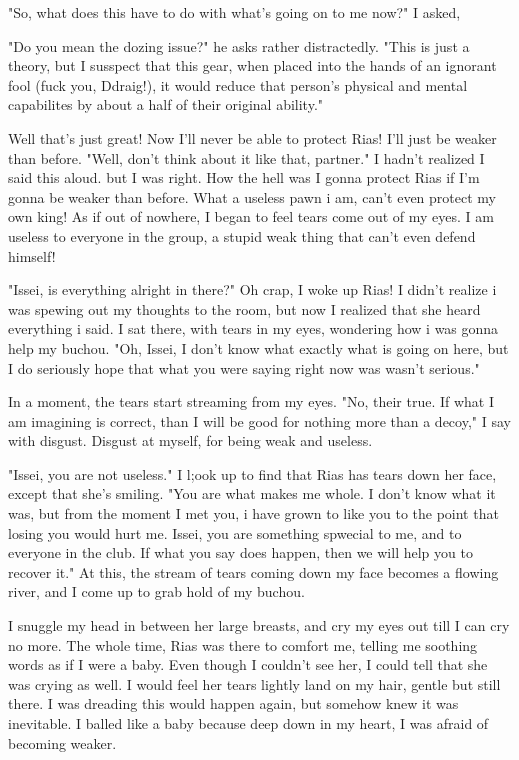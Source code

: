 \documentclass{article}
\begin{document}
"So, what does this have to do with what's going on to me now?" I asked,

"Do you mean the dozing issue?" he asks rather distractedly. "This is just a theory, but I susspect that this gear, when placed into the hands of an ignorant fool (fuck you, Ddraig!), it would reduce that person's physical and mental capabilites by about a half of their original ability."

Well that's just great! Now I'll never be able to protect Rias! I'll just be weaker than before. "Well, don't think about it like that, partner." I hadn't realized I said this aloud. but I was right. How the hell was I gonna protect Rias if I'm gonna be weaker than before. What a useless pawn i am, can't even protect my own king! As if out of nowhere, I began to feel tears come out of my eyes. I am useless to everyone in the group, a stupid weak thing that can't even defend himself!

"Issei, is everything alright in there?" Oh crap, I woke up Rias! I didn't realize i was spewing out my thoughts to the room, but now I realized that she heard everything i said. I sat there, with tears in my eyes, wondering how i was gonna help my buchou. "Oh, Issei, I don't know what exactly what is going on here, but I do seriously hope that what you were saying right now was wasn't serious."

In a moment, the tears start streaming from my eyes. "No, their true. If what I am imagining is correct, than I will be good for nothing more than a decoy," I say with disgust. Disgust at myself, for being weak and useless.

"Issei, you are not useless." I l;ook up to find that Rias has tears down her face, except that she's smiling. "You are what makes me whole. I don't know what it was, but from the moment I met you, i have grown to like you to the point that losing you would hurt me. Issei, you are something spwecial to me, and to everyone in the club. If what you say does happen, then we will help you to recover it." At this, the stream of tears coming down my face becomes a flowing river, and I come up to grab hold of my buchou.

I snuggle my head in between her large breasts, and cry my eyes out till I can cry no more. The whole time, Rias was there to comfort me, telling me soothing words as if I were a baby. Even though I couldn't see her, I could tell that she was crying as well. I would feel her tears lightly land on my hair, gentle but still there. I was dreading this would happen again, but somehow knew it was inevitable. I balled like a baby because deep down in my heart, I was afraid of becoming weaker.
\end{document}
